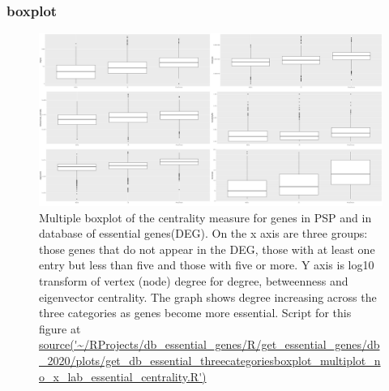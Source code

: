 \subsubsection{boxplot}
\begin{figure}
    \centering
    \includegraphics[width=\textwidth]{images/chapter3/ggplot2/db_essential_genes/Rplot_multiplot_centrality_deg_three_groups_no_xlab.png}
    \caption{Multiple boxplot of the centrality measure for genes in PSP and in database of essential genes(DEG). On the x axis are three groups: those genes that do not appear in the DEG, those with at least one entry but less than five and those with five or more. Y axis is log10 transform of vertex (node) degree for degree, betweenness and eigenvector centrality. The graph shows degree increasing across the three categories as genes become more essential. Script for this figure at \url{source('~/RProjects/db_essential_genes/R/get_essential_genes/db_2020/plots/get_db_essential_threecategoriesboxplot_multiplot_no_x_lab_essential_centrality.R') }}
    \label{fig:boxplot_three_groups_DEG_multiplot}
\end{figure}


